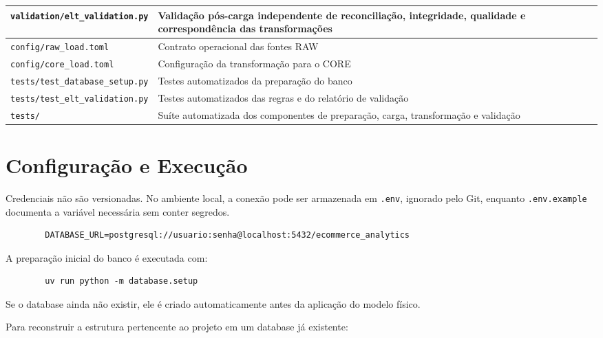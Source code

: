 \documentclass[12pt,a4paper]{article}
\begin{document}
{\begin{longtable}{
				|>{\raggedright\arraybackslash}p{5.2cm}|
				>{\raggedright\arraybackslash}p{9.4cm}|
			}
			\texttt{validation/elt\_validation.py} &
			Validação pós-carga independente de reconciliação, integridade,
			qualidade e correspondência das transformações \\\hline
			
			\texttt{config/raw\_load.toml} &
			Contrato operacional das fontes RAW \\\hline
			
			\texttt{config/core\_load.toml} &
			Configuração da transformação para o CORE \\\hline
			
			\texttt{tests/test\_database\_setup.py} &
			Testes automatizados da preparação do banco \\\hline
			
			\texttt{tests/test\_elt\_validation.py} &
			Testes automatizados das regras e do relatório de validação \\\hline
			
			\texttt{tests/} &
			Suíte automatizada dos componentes de preparação, carga,
			transformação e validação \\\hline
		\end{longtable}
	}
	
	\section{Configuração e Execução}
	
	Credenciais não são versionadas. No ambiente local, a conexão pode ser
	armazenada em \texttt{.env}, ignorado pelo Git, enquanto
	\texttt{.env.example} documenta a variável necessária sem conter segredos.
	
	\begin{verbatim}
		DATABASE_URL=postgresql://usuario:senha@localhost:5432/ecommerce_analytics
	\end{verbatim}
	
	A preparação inicial do banco é executada com:
	
	\begin{verbatim}
		uv run python -m database.setup
	\end{verbatim}
	
	Se o database ainda não existir, ele é criado automaticamente antes da
	aplicação do modelo físico.
	
	Para reconstruir a estrutura pertencente ao projeto em um database já
	existente:
	
\end{document}
